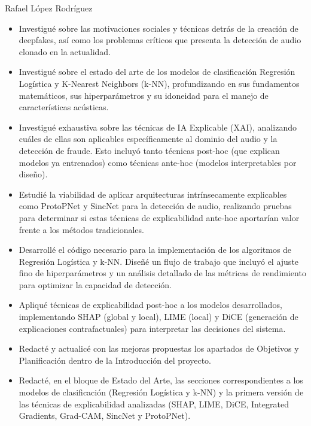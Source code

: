 \begin{contribucion}{Rafael López Rodríguez}

\begin{itemize}

	\item Investigué sobre las motivaciones sociales y técnicas detrás de la creación de deepfakes, así como los problemas críticos que presenta la detección de audio clonado en la actualidad.
	
	\item Investigué sobre el estado del arte de los modelos de clasificación Regresión Logística y K-Nearest Neighbors (k-NN), profundizando en sus fundamentos matemáticos, sus hiperparámetros y su idoneidad para el manejo de características acústicas.
	
	\item Investigué exhaustiva sobre las técnicas de IA Explicable (XAI), analizando cuáles de ellas son aplicables específicamente al dominio del audio y la detección de fraude. Esto incluyó tanto técnicas post-hoc (que explican modelos ya entrenados) como técnicas ante-hoc (modelos interpretables por diseño).
	
	\item Estudié la viabilidad de aplicar arquitecturas intrínsecamente explicables como ProtoPNet y SincNet para la detección de audio, realizando pruebas para determinar si estas técnicas de explicabilidad ante-hoc aportarían valor frente a los métodos tradicionales.
	
	\item Desarrollé el código necesario para la implementación de los algoritmos de Regresión Logística y k-NN. Diseñé un flujo de trabajo que incluyó el ajuste fino de hiperparámetros y un análisis detallado de las métricas de rendimiento para optimizar la capacidad de detección.
	
	\item Apliqué técnicas de explicabilidad post-hoc a los modelos desarrollados, implementando SHAP (global y local), LIME (local) y DiCE (generación de explicaciones contrafactuales) para interpretar las decisiones del sistema.
	
	\item Redacté y actualicé con las mejoras propuestas los apartados de Objetivos y Planificación dentro de la Introducción del proyecto.
	
	\item Redacté, en el bloque de Estado del Arte, las secciones correspondientes a los modelos de clasificación (Regresión Logística y k-NN) y la primera versión de las técnicas de explicabilidad analizadas (SHAP, LIME, DiCE, Integrated Gradients, Grad-CAM, SincNet y ProtoPNet).
	

\end{itemize}
\end{contribucion}
